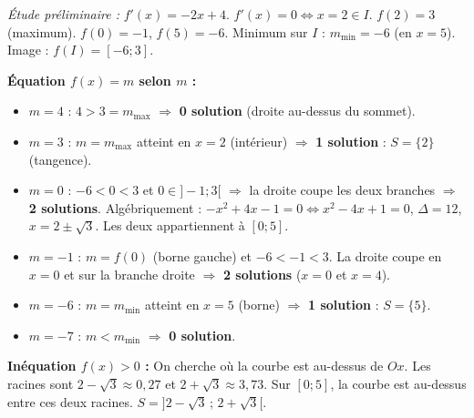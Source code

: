 \documentclass[11pt]{article}
\begin{document}
\begin{exemplebox}[{Exemple complet : $f(x)=-x^2+4x-1$ sur $I=[0;5]$}]
\emph{Étude préliminaire :} $f'(x)=-2x+4$. $f'(x)=0 \Leftrightarrow x=2 \in I$. $f(2)=3$ (maximum). $f(0)=-1$, $f(5)=-6$. Minimum sur $I$ : $m_{\min}=-6$ (en $x=5$). Image : $f(I)=[-6;3]$.

\medskip
\noindent\textbf{Équation $f(x)=m$ selon $m$ :}
\begin{itemize}
\item $m=4$ : $4>3=m_{\max}$ $\Rightarrow$ \textbf{0 solution} (droite au-dessus du sommet).
\item $m=3$ : $m=m_{\max}$ atteint en $x=2$ (intérieur) $\Rightarrow$ \textbf{1 solution} : $S=\{2\}$ (tangence).
\item $m=0$ : $-6<0<3$ et $0 \in ]-1;3[$ $\Rightarrow$ la droite coupe les deux branches $\Rightarrow$ \textbf{2 solutions}. Algébriquement : $-x^2+4x-1=0 \Leftrightarrow x^2-4x+1=0$, $\Delta=12$, $x=2\pm\sqrt{3}$. Les deux appartiennent à $[0;5]$.
\item $m=-1$ : $m=f(0)$ (borne gauche) et $-6 < -1 < 3$. La droite coupe en $x=0$ et sur la branche droite $\Rightarrow$ \textbf{2 solutions} ($x=0$ et $x=4$).
\item $m=-6$ : $m=m_{\min}$ atteint en $x=5$ (borne) $\Rightarrow$ \textbf{1 solution} : $S=\{5\}$.
\item $m=-7$ : $m<m_{\min}$ $\Rightarrow$ \textbf{0 solution}.
\end{itemize}

\medskip
\noindent\textbf{Inéquation $f(x)>0$ :} On cherche où la courbe est au-dessus de $Ox$. Les racines sont $2-\sqrt{3}\approx 0,27$ et $2+\sqrt{3}\approx 3,73$. Sur $[0;5]$, la courbe est au-dessus entre ces deux racines. $S = ]2-\sqrt{3}\,;\,2+\sqrt{3}[$.
\end{exemplebox}
\end{document}
